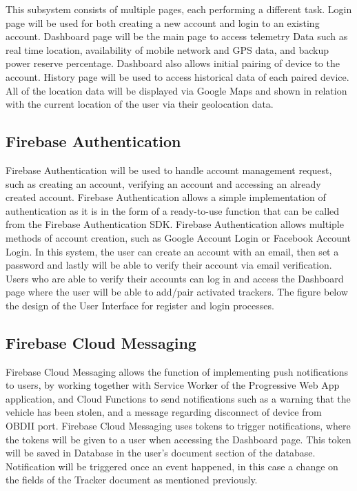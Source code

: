 \documentclass[conference]{IEEEtran}
\begin{document}
This subsystem consists of multiple pages, each performing a different task. Login page will be used for both creating a new account and login to an existing account. Dashboard page will be the main page to access telemetry Data such as real time location, availability of mobile network and GPS data, and backup power reserve percentage. Dashboard also allows initial pairing of device to the account. History page will be used to access historical data of each paired device. All of the location data will be displayed via Google Maps and shown in relation with the current location of the user via their geolocation data. 

\subsection{Firebase Authentication}
Firebase Authentication will be used to handle account management request, such as creating an account, verifying an account and accessing an already created account. Firebase Authentication allows a simple implementation of authentication as it is in the form of a ready-to-use function that can be called from the Firebase Authentication SDK. Firebase Authentication allows multiple methods of 
account creation, such as Google Account Login or Facebook Account Login. In this system, the user can create an account with an email, then set a password and lastly will be able to verify their account via email verification. Users who are able to verify their accounts  can log in and access the Dashboard page where the user will be able to add/pair activated trackers. The figure below the design of the User Interface for register and login processes.


\subsection{Firebase Cloud Messaging}
Firebase Cloud Messaging allows the function of implementing push notifications to users, by working together with Service Worker of the Progressive Web App application, and Cloud Functions to send notifications such as a warning that the vehicle has been stolen, and a message regarding disconnect of device from OBDII port. Firebase Cloud Messaging uses tokens to trigger notifications, where the tokens will be given to a user when accessing the Dashboard page. This token will be saved in Database in the user's document section of the database. Notification will be triggered once an event happened, in this case a change on the fields of the Tracker document as mentioned previously. 
\end{document}
